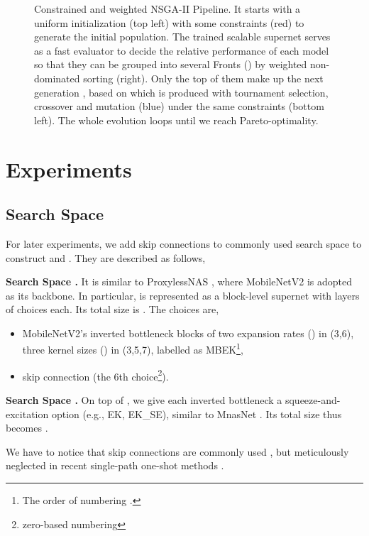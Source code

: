 \documentclass[10pt,twocolumn,letterpaper]{article}
\theoremstyle{definition}
\begin{document}
\begin{figure}[ht]
	\centering
\caption{Constrained and weighted NSGA-II Pipeline. It starts with a uniform initialization (top left) with some constraints (red) to generate the initial population. The trained scalable supernet serves as a fast evaluator to decide the relative performance of each model so that they can be grouped into several Fronts () by weighted non-dominated sorting (right). Only the top  of them make up the next generation , based on which  is produced with tournament selection, crossover and mutation (blue) under the same constraints (bottom left). The whole evolution loops until we reach Pareto-optimality.}
	\label{fig:nas-pipeline}
\end{figure}

\section{Experiments}

\subsection{Search Space}\label{sec:ss}
For later experiments, we add skip connections to commonly used search space to construct   and . They are described as follows,

\textbf{Search Space .} 
It is similar to ProxylessNAS \cite{cai2018proxylessnas}, where MobileNetV2 \cite{sandler2018mobilenetv2} is adopted as its backbone. In particular,  is represented as a block-level supernet with  layers of  choices each. Its total size is . The choices are,

\begin{itemize}
	\item MobileNetV2's inverted bottleneck blocks \cite{sandler2018mobilenetv2} of two expansion rates () in (3,6), three kernel sizes () in (3,5,7), labelled as MBEK\footnote{The order of numbering  .}, 
	\item skip connection (the 6th choice\footnote{zero-based numbering}).
\end{itemize}

\textbf{Search Space .} On top of , we give each inverted bottleneck a squeeze-and-excitation \cite{hu2018squeeze} option (e.g., EK, EK\_SE), similar to MnasNet \cite{tan2018mnasnet}. Its total size thus becomes .

We have to notice that skip connections are commonly used \cite{tan2018mnasnet,liu2018darts,bender2018understanding}, but meticulously neglected in recent single-path one-shot methods \cite{guo2019single,chu2019fairnas}. 
\end{document}
